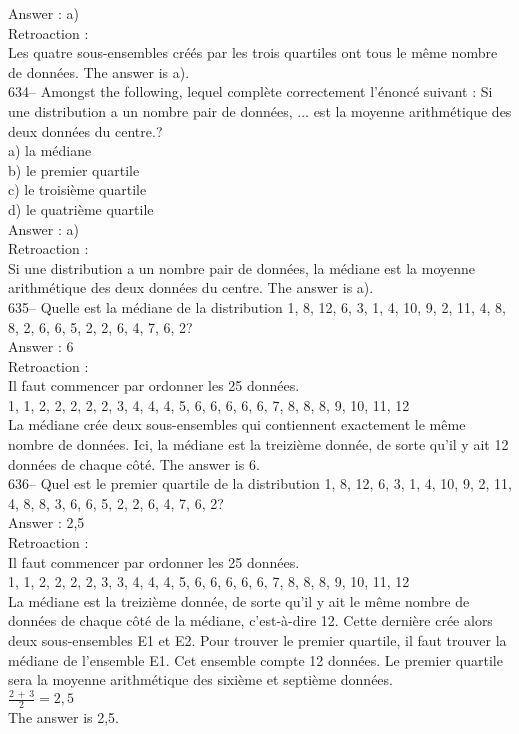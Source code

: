 ﻿\documentclass[letterpaper, 12pt]{article}
\begin{document}
Answer : a)\\

Retroaction : \\
Les quatre sous-ensembles cr\'e\'es par les trois quartiles ont tous le
m\^eme nombre de donn\'ees.  The answer is a).\\

634-- Amongst the following, lequel compl\`ete
correctement l'\'enonc\'e suivant : \og Si une distribution a un
nombre pair de donn\'ees, $\ldots$ est la moyenne arithm\'etique des deux donn\'ees du centre.\fg?\\
a) la m\'ediane\\
b) le premier quartile\\
c) le troisi\`eme quartile\\
d) le quatri\`eme quartile\\

Answer : a)\\

Retroaction :\\
Si une distribution a un nombre pair de donn\'ees, la m\'ediane est la
moyenne arithm\'etique des deux donn\'ees du centre.  The answer is a).
\\

635--  Quelle est la m\'ediane de la distribution 1, 8, 12, 6, 3, 1, 4, 10,
9, 2, 11, 4, 8, 8, 2, 6, 6, 5, 2, 2, 6, 4, 7, 6, 2?\\

Answer : 6\\

Retroaction : \\
Il faut commencer par ordonner les 25 donn\'ees.\\
1, 1, 2, 2, 2, 2, 2, 3, 4, 4, 4, 5, 6, 6, 6, 6, 6, 7, 8, 8, 8, 9, 10, 11,
12\\
La m\'ediane cr\'ee deux sous-ensembles qui contiennent exactement le m\^eme
nombre de donn\'ees.  Ici, la m\'ediane est la treizi\`eme donn\'ee, de
sorte qu'il y ait 12 donn\'ees de chaque c\^ot\'e.  The answer is 6.\\

636--  Quel est le premier quartile de la distribution 1, 8, 12, 6, 3, 1, 4,
10, 9, 2, 11, 4, 8, 8, 3, 6, 6, 5, 2, 2, 6, 4, 7, 6, 2?\\

Answer : 2,5\\

Retroaction : \\
Il faut commencer par ordonner les 25 donn\'ees.\\
1, 1, 2, 2, 2, 2, 3, 3, 4, 4, 4, 5, 6, 6, 6, 6, 6, 7, 8, 8, 8, 9, 10, 11,
12\\
La m\'ediane est la treizi\`eme donn\'ee, de sorte qu'il y ait le m\^eme
nombre de donn\'ees de chaque c\^ot\'e de la m\'ediane, c'est-\`a-dire 12.
Cette derni\`ere cr\'ee alors deux sous-ensembles E1 et E2.  Pour trouver le
premier quartile, il faut trouver la m\'ediane de l'ensemble E1.  Cet
ensemble compte 12 donn\'ees.  Le premier quartile sera la moyenne
arithm\'etique des sixi\`eme et septi\`eme donn\'ees.  \\[2mm]
$\frac{2\,+\,3}{2}=2,5$\\[2mm]
The answer is 2,5.\\
\end{document}
